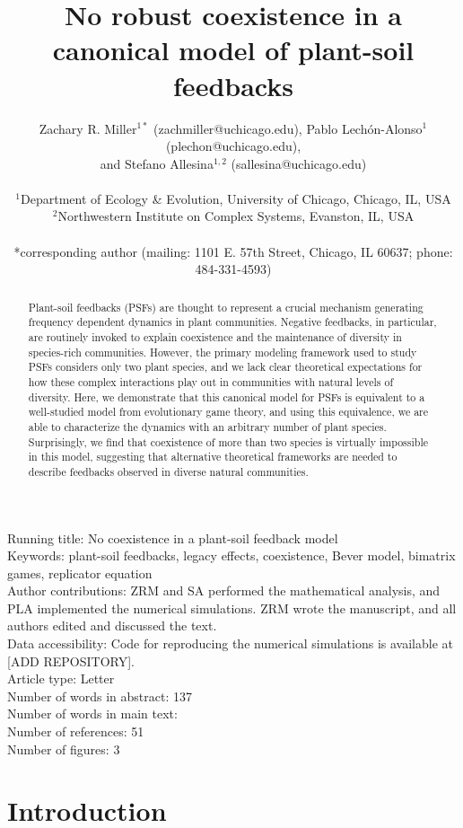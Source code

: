 \documentclass[11pt]{article}
\title{No robust coexistence in a canonical model of plant-soil feedbacks}
\date{}
\author{Zachary R. Miller$^{1*}$ (zachmiller@uchicago.edu), Pablo Lech\'{o}n-Alonso$^{1}$ (plechon@uchicago.edu),\\ and Stefano Allesina$^{1,2}$ (sallesina@uchicago.edu) \\
	\\
	\normalsize{$^{1}$Department of Ecology \& Evolution, University of Chicago, Chicago, IL, USA}\\
	\normalsize{$^{2}$Northwestern Institute on Complex Systems, Evanston, IL, USA}\\
	\\
	\normalsize{*corresponding author (mailing: 1101 E. 57th Street, Chicago, IL 60637; phone: 484-331-4593)}\\
}
\begin{document}
	
\maketitle
{}

\noindent Running title: No coexistence in a plant-soil feedback model\\
Keywords: plant-soil feedbacks, legacy effects, coexistence, Bever model, bimatrix games, replicator equation \\

\noindent Author contributions: ZRM and SA performed the mathematical analysis, and PLA implemented the numerical simulations. ZRM wrote the manuscript, and all authors edited and discussed the text. \\

\noindent Data accessibility: Code for reproducing the numerical simulations is available at [ADD REPOSITORY].\\

\noindent Article type: Letter\\
Number of words in abstract: 137\\
Number of words in main text: \\
Number of references: 51 \\
Number of figures: 3

\linenumbers

\begin{abstract}
Plant-soil feedbacks (PSFs) are thought to represent a crucial mechanism generating frequency dependent dynamics in plant communities. Negative feedbacks, in particular, are routinely invoked to explain coexistence and the maintenance of diversity in species-rich communities. However, the primary modeling framework used to study PSFs considers only two plant species, and we lack clear theoretical expectations for how these complex interactions play out in communities with natural levels of diversity. Here, we demonstrate that this canonical model for PSFs is equivalent to a well-studied model from evolutionary game theory, and using this equivalence, we are able to characterize the dynamics with an arbitrary number of plant species. Surprisingly, we find that coexistence of more than two species is virtually impossible in this model, suggesting that alternative theoretical frameworks are needed to describe feedbacks observed in diverse natural communities. 
\end{abstract}

\section{Introduction}
\end{document}
